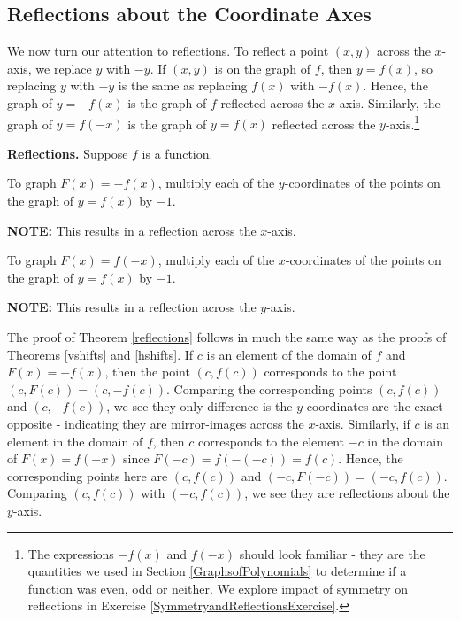 \subsection{Reflections about the Coordinate Axes}

We now turn our attention to reflections.  To reflect a point $(x,y)$ across the $x$-axis, we replace $y$ with $-y$.  If $(x,y)$ is on the graph of $f$, then $y=f(x)$, so replacing $y$ with $-y$ is the same as replacing $f(x)$ with $-f(x)$.  Hence, the graph of $y=-f(x)$ is the graph of $f$ reflected across the $x$-axis.  Similarly, the graph of $y=f(-x)$ is the graph of $y = f(x)$ reflected across the $y$-axis.\footnote{The expressions $-f(x)$ and $f(-x)$ should look familiar - they are the quantities we used in Section \ref{GraphsofPolynomials} to determine if a function was even, odd or neither.  We explore impact of symmetry on reflections in Exercise \ref{SymmetryandReflectionsExercise}.}   

\smallskip

\colorbox{ResultColor}{\bbm


\begin{thm} \label{reflections}\textbf{Reflections.}  Suppose $f$ is a function. 

  To graph $F(x)=-f(x)$,  multiply each of the $y$-coordinates of the points on the graph of $y=f(x)$ by $-1$.

\textbf{NOTE:}  This results in a reflection across the $x$-axis.

To graph $F(x)=f(-x)$,  multiply each of the $x$-coordinates of the points on the graph of $y=f(x)$ by $-1$.

\textbf{NOTE:}  This results in a reflection across the $y$-axis.


\end{thm}

\ebm}

\smallskip

The proof of Theorem \ref{reflections} follows in much the same way as the proofs of Theorems \ref{vshifts} and \ref{hshifts}.  If $c$ is an element of the domain of $f$ and $F(x) = -f(x)$,  then the point $(c, f(c))$ corresponds to the point $(c, F(c)) = (c,-f(c))$.  Comparing the corresponding points $(c, f(c))$ and $(c, -f(c))$, we see they only difference is the $y$-coordinates are the exact opposite - indicating they are mirror-images across the $x$-axis.  Similarly, if $c$ is an element in the domain of $f$, then $c$ corresponds to the element $-c$ in the domain of $F(x) = f(-x)$ since $F(-c) = f(-(-c)) = f(c)$. Hence, the corresponding points here are $(c, f(c))$ and $(-c, F(-c)) = (-c, f(c))$.  Comparing $(c, f(c))$ with $(-c, f(c))$, we see they are reflections about the $y$-axis.

